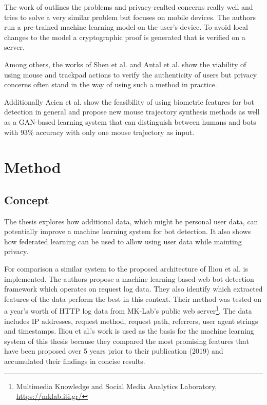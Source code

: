 \documentclass[
    fontsize=12pt,
    headings=small,
    parskip=half,           %
    bibliography=totoc,
    numbers=noenddot,       %
    open=any,               %
    final                   %
    ]{scrreprt}
\begin{document}
The work of \cite{PETS2021} outlines the problems and privacy-realted concerns really well and tries to solve a very similar problem but focuses on mobile devices. The authors run a pre-trained machine learning model on the user's device. To avoid local changes to the model a cryptographic proof is generated that is verified on a server.

Among others, the works of Shen et al. \cite{6263955} and Antal et al. \cite{9111596} \cite{DBLP:journals/corr/abs-1810-04668} show the viability of using mouse and trackpad actions to verify the authenticity of users but privacy concerns often stand in the way of using such a method in practice.

Additionally Acien et al. \cite{Acien2020BeCAPTCHAMouseSM} show the feasibility of using biometric features for bot detection in general and propose new mouse trajectory synthesis methods as well as a GAN-based learning system that can distinguish between humans and bots with 93\% accuracy with only one mouse trajectory as input.


\chapter{Method}


\section{Concept}

The thesis explores how additional data, which might be personal user data, can potentially improve a machine learning system for bot detection. It also shows how federated learning can be used to allow using user data while mainting privacy.

For comparison a similar system to the proposed architecture of Iliou et al. \cite{10.1145/3339252.3339267} is implemented. The authors propose a machine learning based web bot detection framework which operates on request log data. They also identify which extracted features of the data perform the best in this context. Their method was tested on a year's worth of HTTP log data from MK-Lab's public web server\footnote{Multimedia Knowledge and Social Media Analytics Laboratory, \url{https://mklab.iti.gr/}}. The data includes IP addresses, request method, request path, referrers, user agent strings and timestamps.
Iliou et al.'s work is used as the basis for the machine learning system of this thesis because they compared the most promising features that have been proposed over 5 years prior to their publication (2019) and accumulated their findings in concise results.
\end{document}
